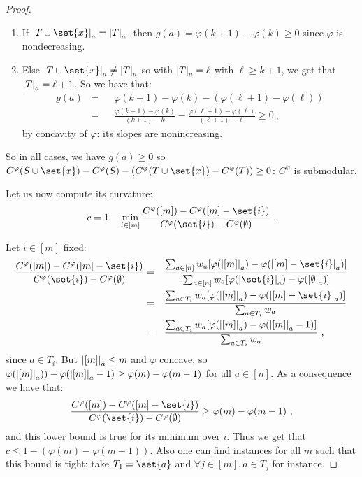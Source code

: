 \begin{proof}
\begin{enumerate}
\begin{enumerate}
      \begin{enumerate}
      \item If $\abs{T\cup\set{x}}_a = \abs{T}_a$, then $g(a) =  \varphi(k+1) - \varphi(k) \geq 0$ since $\varphi$ is nondecreasing.
      \item Else $\abs{T\cup\set{x}}_a \not= \abs{T}_a$ so with $\abs{T}_a = \ell$ with $\ell \geq k+1$, we get that $\abs{T}_a = \ell+1$. So we have that:
        \begin{equation}
          \begin{aligned}
            g(a) &=&& \varphi(k+1) - \varphi(k) - (\varphi(\ell+1) - \varphi(\ell))\\
            &=&& \frac{\varphi(k+1) - \varphi(k)}{(k+1) - k} - \frac{\varphi(\ell+1) - \varphi(\ell)}{(\ell+1) - \ell} \geq 0\ ,
          \end{aligned}
        \end{equation}
        by concavity of $\varphi$: its slopes are nonincreasing.
      \end{enumerate}
    \end{enumerate}
  \end{enumerate}
  So in all cases, we have $g(a) \geq 0$ so $ C^{\varphi}(S \cup \set{x}) - C^{\varphi}(S) - (C^{\varphi}(T \cup \set{x}) - C^{\varphi}(T)) \geq 0$: $C^{\varphi}$ is submodular.

  Let us now compute its curvature:
  \[c = 1 - \min_{i \in [m]} \frac{C^{\varphi}([m]) - C^{\varphi}([m]-\set{i})}{C^{\varphi}(\set{i}) - C^{\varphi}(\emptyset)}\ .\]

  Let $i \in [m]$ fixed:
  \begin{equation}
    \begin{aligned}
      \frac{C^{\varphi}([m]) - C^{\varphi}([m]-\set{i})}{C^{\varphi}(\set{i}) - C^{\varphi}(\emptyset)} &=&& \frac{\sum_{a \in [n]} w_a[\varphi(\abs{[m]}_a) - \varphi(\abs{[m]-\set{i}}_a)]}{\sum_{a \in [n]}w_a[\varphi(\abs{\set{i}}_a) - \varphi(\abs{\emptyset}_a)]}\\
      &=&& \frac{\sum_{a \in T_i} w_a[\varphi(\abs{[m]}_a) - \varphi(\abs{[m]-\set{i}}_a)]}{\sum_{a \in T_i} w_a}\\
      &=&& \frac{\sum_{a \in T_i} w_a[\varphi(\abs{[m]}_a) - \varphi(\abs{[m]}_a-1)]}{\sum_{a \in T_i} w_a}\ ,\\
    \end{aligned}
  \end{equation}
  since $a \in T_i$. But $\abs{[m]}_a \leq m$ and $\varphi$ concave, so $\varphi(\abs{[m]}_a)) - \varphi(\abs{[m]}_a-1) \geq \varphi(m) - \varphi(m-1)$ for all $a \in [n]$. As a consequence we have that:
  \[\frac{C^{\varphi}([m]) - C^{\varphi}([m]-\set{i})}{C^{\varphi}(\set{i}) - C^{\varphi}(\emptyset)} \geq \varphi(m) - \varphi(m-1)\ ,\]
  and this lower bound is true for its minimum over $i$. Thus we get that $c \leq 1 - (\varphi(m) - \varphi(m-1))$.
  Also one can find instances for all $m$ such that this bound is tight: take $T_1 =\set{a}$ and $\forall j \in [m], a \in T_j$ for instance.
\end{proof}


